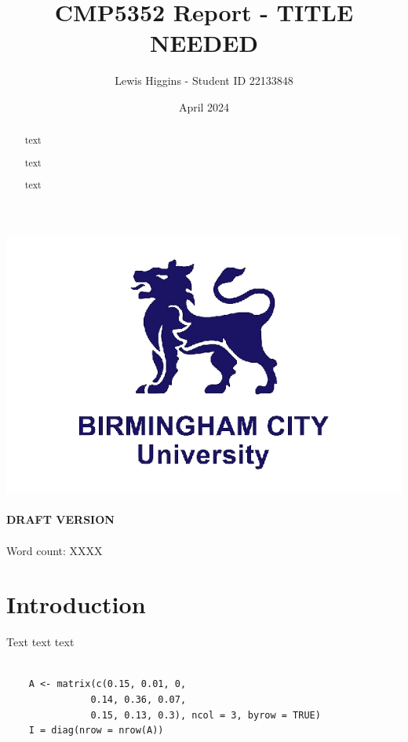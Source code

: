 \documentclass[12pt]{report}
\title{CMP5352 Report - TITLE NEEDED}
\author{Lewis Higgins - Student ID 22133848}
\date{April 2024}
\begin{document}
    \pagecolor{yellow} %

    \makeatletter
    \begin{titlepage}
        \begin{center}
            \includegraphics[width=0.7\linewidth]{bcu logo}\\[4ex]
            {\large \bfseries  \@title }\\[2ex]
            {\large \bfseries  DRAFT VERSION }\\[2ex]
            {\@author}\\[30ex]
            {Word count: XXXX}\\[20ex]
        \end{center}
    \end{titlepage}
    \makeatother
    \thispagestyle{empty}
    \newpage

    \pagecolor{white}

    \begin{abstract}
        text

        text

        text

    \end{abstract}

    \setcounter{page}{0} %

    \tableofcontents
    \thispagestyle{empty}


    \setcounter{page}{0} %

    \chapter*{Introduction}\label{ch:introduction}

    Text text text

    \begin{verbatim}

    A <- matrix(c(0.15, 0.01, 0,
               0.14, 0.36, 0.07,
               0.15, 0.13, 0.3), ncol = 3, byrow = TRUE)
    I = diag(nrow = nrow(A))

    \end{verbatim}
\end{document}
